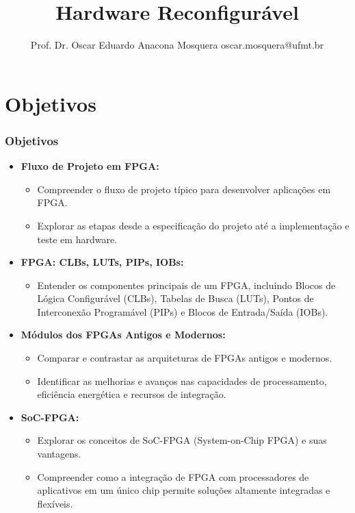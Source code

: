 \documentclass[aspectratio=169]{beamer}
\title[Minicurso FPGAs]{\huge Hardware Reconfigurável}
\author[Prof. Dr. Oscar Eduardo Anacona Mosquera]{Prof. Dr. Oscar Eduardo Anacona Mosquera \newline\newline 
\scriptsize{oscar.mosquera@ufmt.br}
}
\begin{document}
\begin{frame}[plain]
\titlepage
\end{frame}

\section{Objetivos}

\begin{frame}
	\frametitle{Objetivos}
	
	\begin{itemize}
		\item \textbf{Fluxo de Projeto em FPGA:}
		\begin{itemize}
			\item Compreender o fluxo de projeto típico para desenvolver aplicações em FPGA.
			\item Explorar as etapas desde a especificação do projeto até a implementação e teste em hardware.
		\end{itemize}
		
		\item \textbf{FPGA: CLBs, LUTs, PIPs, IOBs:}
		\begin{itemize}
			\item Entender os componentes principais de um FPGA, incluindo Blocos de Lógica Configurável (CLBs), Tabelas de Busca (LUTs), Pontos de Interconexão Programável (PIPs) e Blocos de Entrada/Saída (IOBs).
		\end{itemize}
		
		\item \textbf{Módulos dos FPGAs Antigos e Modernos:}
		\begin{itemize}
			\item Comparar e contrastar as arquiteturas de FPGAs antigos e modernos.
			\item Identificar as melhorias e avanços nas capacidades de processamento, eficiência energética e recursos de integração.
		\end{itemize}
		
		\item \textbf{SoC-FPGA:}
		\begin{itemize}
			\item Explorar os conceitos de SoC-FPGA (System-on-Chip FPGA) e suas vantagens.
			\item Compreender como a integração de FPGA com processadores de aplicativos em um único chip permite soluções altamente integradas e flexíveis.
		\end{itemize}
	\end{itemize}

\end{frame}
\end{document}
